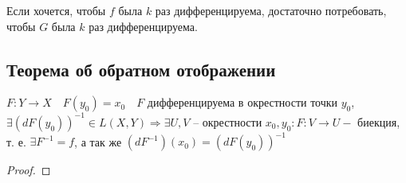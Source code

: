 \follow Если хочется, чтобы $f$ была $k$ раз дифференцируема, достаточно потребовать, чтобы $G$ была $k$ раз дифференцируема.

\subsection{Теорема об обратном отображении}
\begin{theorem}
    $F \colon Y \to X \quad F(y_0) = x_0 \quad F$ дифференцируема в окрестности точки $y_0$, $\exists (d F(y_0))^{-1} \in L(X, Y) \Rightarrow \exists U, V$ -- окрестности $x_0, y_0 \colon F \colon V \to U -$ биекция, т. е. $\exists F^{-1} = f$, а так же $(dF^{-1})(x_0) = (d F(y_0))^{-1}$
\end{theorem}
\begin{proof}

\end{proof}
